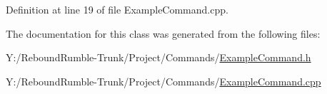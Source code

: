 \-Definition at line 19 of file \-Example\-Command.\-cpp.



\-The documentation for this class was generated from the following files\-:\begin{DoxyCompactItemize}
\item 
\-Y\-:/\-Rebound\-Rumble-\/\-Trunk/\-Project/\-Commands/\hyperlink{_example_command_8h}{\-Example\-Command.\-h}\item 
\-Y\-:/\-Rebound\-Rumble-\/\-Trunk/\-Project/\-Commands/\hyperlink{_example_command_8cpp}{\-Example\-Command.\-cpp}\end{DoxyCompactItemize}
